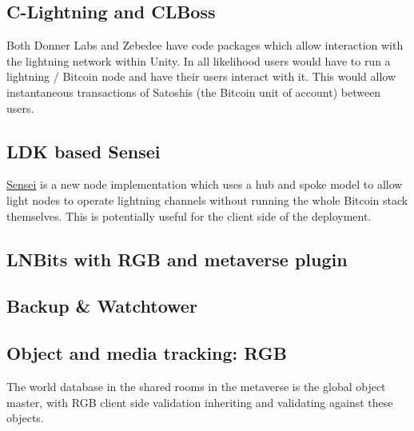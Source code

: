 \subsection{C-Lightning and CLBoss}
\lipsum[50]
Both Donner Labs and Zebedee have code packages which allow interaction with the lightning network within Unity. In all likelihood users would have to run a lightning / Bitcoin node and have their users interact with it. This would allow instantaneous transactions of Satoshis (the Bitcoin unit of account) between users. 
\subsection{LDK based Sensei}
\href{https://l2.technology/sensei}{Sensei} is a new node implementation which uses a hub and spoke model to allow light nodes to operate lightning channels without running the whole Bitcoin stack themselves. This is potentially useful for the client side of the deployment.

\subsection{LNBits with RGB and metaverse plugin}
\subsection{Backup \& Watchtower}
\lipsum[50]
\subsection{Object and media tracking: RGB}
The world database in the shared rooms in the metaverse is the global object master, with RGB client side validation inheriting and validating against these objects.\par

